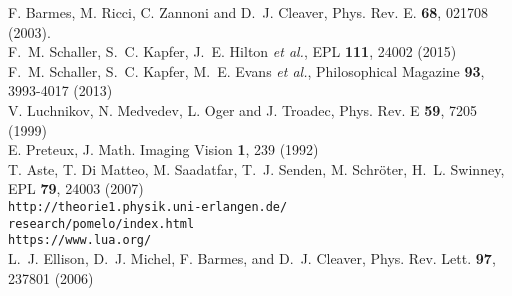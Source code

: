 \documentclass[epj,twocolumn]{webofc}
\begin{document}
\begin{thebibliography}{}
%
%
F. Barmes, M. Ricci, C. Zannoni and D.~J. Cleaver, Phys. Rev. E. \textbf{68}, 021708 (2003).\\

    F.~M. Schaller, S.~C. Kapfer, J.~E. Hilton \textit{et al.}, EPL \textbf{111}, 24002 (2015)\\

    F.~M. Schaller, S.~C. Kapfer, M.~E. Evans \textit{et al.}, Philosophical Magazine \textbf{93}, 3993-4017 (2013)\\

    V. Luchnikov, N. Medvedev, L. Oger and J. Troadec, Phys. Rev. E \textbf{59}, 7205 (1999)\\

    E. Preteux, J. Math. Imaging Vision \textbf{1}, 239 (1992)\\

T. Aste, T. Di Matteo, M. Saadatfar, T.~J. Senden, M. Schröter, H.~L. Swinney, EPL \textbf{79}, 24003 (2007)\\

\verb~http://theorie1.physik.uni-erlangen.de/~\\\verb~research/pomelo/index.html~\\

\verb~https://www.lua.org/~\\

L.~J. Ellison, D.~J. Michel, F. Barmes, and D.~J. Cleaver, Phys. Rev. Lett. \textbf{97}, 237801 (2006)\\
\end{thebibliography}
\end{document}

